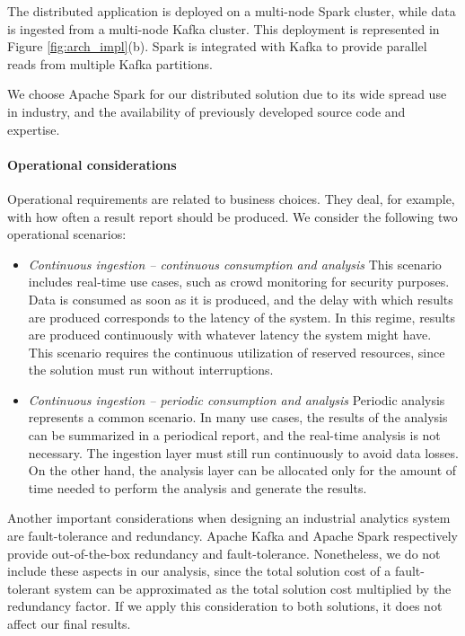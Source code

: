 {The distributed application is deployed on a multi-node Spark cluster, while data is ingested from a multi-node Kafka cluster. This deployment is represented in Figure \ref{fig:arch_impl}(b). Spark is integrated with Kafka to provide parallel reads from multiple Kafka partitions. 

We choose Apache Spark for our distributed solution due to its wide spread use in industry, and the availability of previously developed source code and expertise.
\paragraph{Operational considerations}
Operational requirements are related to business choices. They deal, for example, with how often a result report should be produced. We consider the following two operational scenarios:
\begin{itemize}
\item \textit{Continuous ingestion -- continuous consumption and analysis} This scenario includes real-time use cases, such as crowd monitoring for security purposes. Data is consumed as soon as it is produced, and the delay with which results are produced corresponds to the latency of the system. In this regime, results are produced continuously with whatever latency the system might have. This scenario requires the continuous utilization of reserved resources, since the solution must run without interruptions.
\item \textit{Continuous ingestion -- periodic consumption and analysis } Periodic analysis represents a common scenario. In many use cases, the results of the analysis can be summarized in a periodical report, and the real-time analysis is not necessary. The ingestion layer must still run continuously to avoid data losses. On the other hand, the analysis layer can be allocated only for the amount of time needed to perform the analysis and generate the results.
\end{itemize}

Another important considerations when designing an industrial analytics system are fault-tolerance and redundancy. Apache Kafka and Apache Spark respectively provide out-of-the-box redundancy and fault-tolerance. Nonetheless, we do not include these aspects in our analysis, since the total solution cost of a fault-tolerant system can be approximated as the total solution cost multiplied by the redundancy factor. If we apply this consideration to both solutions, it does not affect our final results.

}
